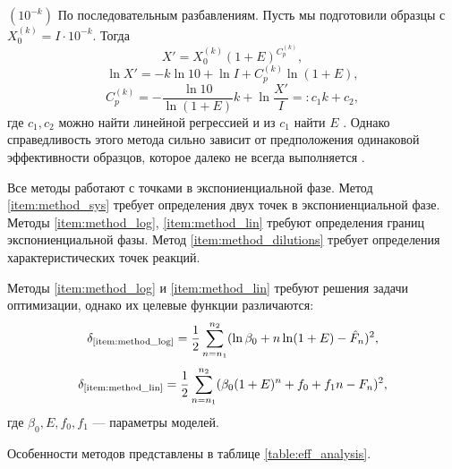 \begin{labeldesc}
  \item[$(10^{-k})$]\label{item:method_dilutions}
  По последовательным разбавлениям. Пусть мы подготовили образцы с
  $X_0^{(k)}=I\cdot 10^{-k}$. Тогда
  \[
    X'=X_0^{(k)}(1+E)^{C_{p}^{(k)}},
  \]
  \[
    \ln X' = -k\ln 10 + \ln I + C_{p}^{(k)}\ln (1+E),
  \]
  \[
    C_{p}^{(k)}=-\frac{\ln 10}{\ln (1+E)}k+\ln\frac{X'}{I}=:c_1 k+c_2,
  \]
  где $c_1,c_2$ можно найти линейной регрессией и из $c_1$ найти $E$
  \cite{rasmussenQuantificationLightCycler2001}. Однако справедливость
  этого метода сильно зависит от предположения одинаковой эффективности
  образцов, которое далеко не всегда выполняется
  \cite{ramakersAssumptionfreeAnalysisQuantitative2003}.
\end{labeldesc}

Все методы работают с точками в экспониенциальной фазе. Метод
\ref{item:method_sys} требует определения двух точек в экспониенциальной фазе.
Методы \ref{item:method_log}, \ref{item:method_lin} требуют определения границ
экспониенциальной фазы. Метод \ref{item:method_dilutions} требует определения
характеристических точек реакций.

Методы \ref{item:method_log} и \ref{item:method_lin} требуют решения задачи
оптимизации, однако их целевые функции различаются:
\[
  \delta_{\text{\ref{item:method_log}}}=\frac{1}{2}\sum_{n=n_1}^{n_2}(\ln \beta_0+n\ln(1+E)-\hat F_{n})^{2},
\]
\[
  \delta_{\text{\ref{item:method_lin}}}=\frac{1}{2}\sum_{n=n_1}^{n_2}(\beta_0(1+E)^{n}+f_0+f_1n-F_{n})^{2},
\]
где $\beta_0,E,f_0,f_1$ --- параметры моделей.

Особенности методов представлены в таблице \ref{table:eff_analysis}.

